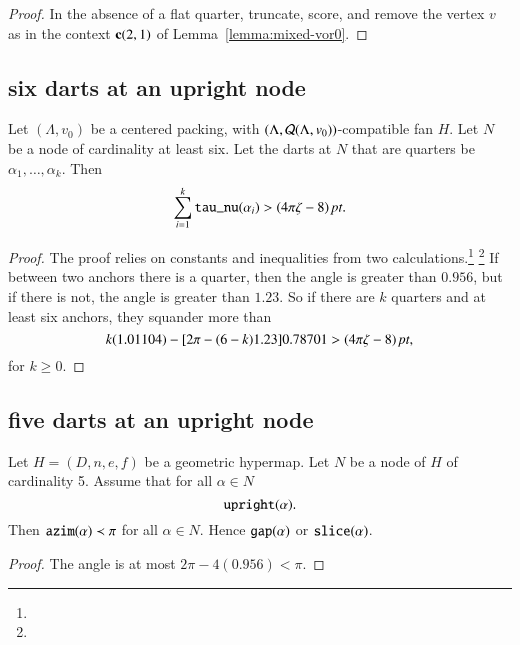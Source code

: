 \begin{proof}
In the absence of a flat quarter, truncate, score, and remove the
vertex $v$ as in the context ${\operatorname{\bf c}}{(2,1)}$ of
Lemma~\ref{lemma:mixed-vor0}. 
\end{proof}

\subsection{six darts at an upright node}

\begin{lemma}  
Let $(\Lambda,v_0)$ be a centered packing, 
with $(\Lambda,{\mathcal Q}(\Lambda,v_0))$-compatible fan $H$.
Let $N$ be a node of cardinality at least six.
Let the darts at $N$ that are quarters be
$\alpha_1,\ldots,\alpha_k$.
Then 
  $$
  \sum_{i=1}^k{\operatorname{{\texttt{tau\_nu}}}}(\alpha_i) > (4\pi\zeta-8)\,\hbox{\it pt}.
  $$
\end{lemma}

\begin{proof}
The proof relies on constants and inequalities from two
calculations.\footnote{} %
\footnote{} %
If between two anchors there is a quarter, then the angle is
greater than $0.956$, but if there is not,  the angle is greater than
$1.23$.  So if there are $k$ quarters and at least six anchors, they
squander more than
    $$ k (1.01104) - [2\pi-(6-k)1.23]0.78701 > (4\pi\zeta-8)\,\hbox{\it pt},$$
for $k\ge0$.
\end{proof}

\subsection{five darts at an upright node}
\label{sec:5updart}

\begin{lemma}\label{a:5dart:concave}  
Let $H=(D,n,e,f)$ be a geometric
hypermap.  Let $N$ 
be a node of $H$ of cardinality 5.    Assume that for all $\alpha\in N$
  $$
  {\operatorname{{\texttt{upright}}}}(\alpha).
  $$
Then ${\operatorname{{\texttt{azim}}}}(\alpha)\prec \pi$ for all $\alpha\in N$.
Hence ${\operatorname{{\texttt{gap}}}}(\alpha)$ or ${\operatorname{{\texttt{slice}}}}(\alpha)$.
\end{lemma}

\begin{proof}  The angle is at most $2\pi - 4(0.956) < \pi$.
\end{proof}

